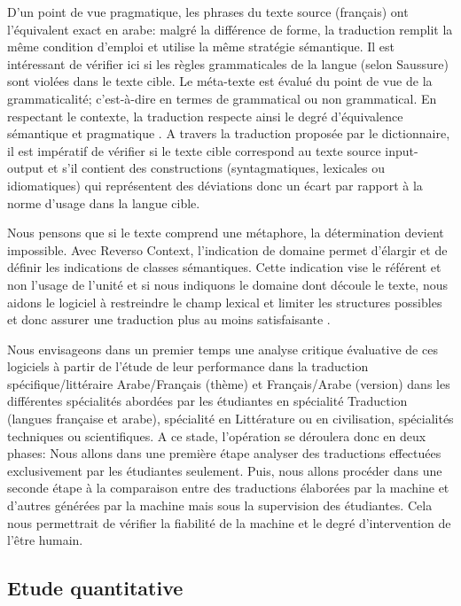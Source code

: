 \documentclass{textolivre}
\begin{document}
D’un point de vue pragmatique, les phrases du texte source (français) ont l’équivalent exact en arabe: malgré la différence de forme, la traduction remplit la même condition d'emploi et utilise la même stratégie sémantique. Il est intéressant de vérifier ici si les règles grammaticales de la langue (selon Saussure) sont violées dans le texte cible. Le méta-texte est évalué du point de vue de la grammaticalité; c'est-à-dire en termes de grammatical ou non grammatical. En respectant le contexte, la traduction respecte ainsi le degré d'équivalence sémantique et pragmatique \cite{bastuji1981}. A travers la traduction proposée par le dictionnaire, il est impératif de vérifier si le texte cible correspond au texte source input-output \cite[p. 216]{white2003} et s’il contient des constructions (syntagmatiques, lexicales ou idiomatiques) qui représentent des déviations donc un écart par rapport à la norme d’usage dans la langue cible. 

Nous pensons que si le texte comprend une métaphore, la détermination devient impossible. Avec Reverso Context, l'indication de domaine permet d'élargir et de définir les indications de classes sémantiques. Cette indication vise le référent et non l'usage de l'unité et si nous indiquons le domaine dont découle le texte, nous aidons le logiciel à restreindre le champ lexical et limiter les structures possibles et donc assurer une traduction plus au moins satisfaisante \cite[p. 168]{lab1988}.  

Nous envisageons dans un premier temps une analyse critique évaluative de ces logiciels à partir de l’étude de leur performance dans la traduction spécifique/littéraire Arabe/Français (thème) et Français/Arabe (version) dans les différentes spécialités abordées par les étudiantes en spécialité Traduction (langues française et arabe), spécialité en Littérature ou en civilisation, spécialités techniques ou scientifiques. A ce stade, l’opération se déroulera donc en deux phases: Nous allons dans une première étape analyser des traductions effectuées exclusivement par les étudiantes seulement. Puis, nous allons procéder dans une seconde étape à la comparaison entre des traductions élaborées par la machine et d’autres générées par la machine mais sous la supervision des étudiantes. Cela nous permettrait de vérifier la fiabilité de la machine et le degré d’intervention de l’être humain.

\subsection{Etude quantitative}\label{sec-quantitative}
\end{document}
